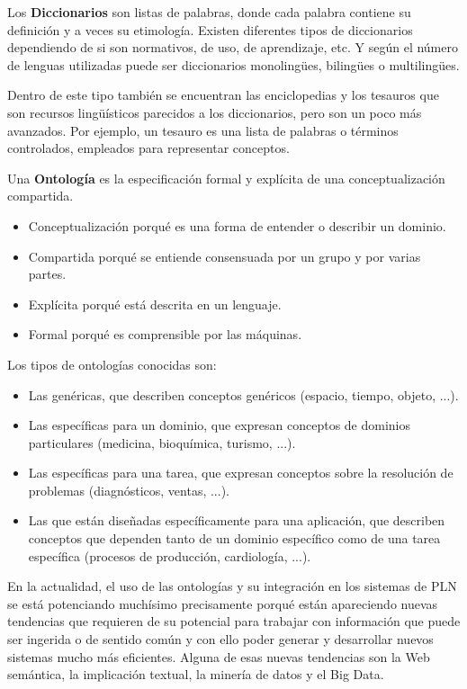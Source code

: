 \documentclass[11pt]{exam}
\begin{document}
\begin{questions}
Los {\bf Diccionarios} son listas de palabras, donde cada palabra contiene su definición y a veces su etimología. Existen diferentes tipos de diccionarios dependiendo de si son normativos, de uso, de aprendizaje, etc. Y según el número de lenguas utilizadas puede ser diccionarios monolingües, bilingües o multilingües.

Dentro de este tipo también se encuentran las enciclopedias y los tesauros que son recursos lingüísticos parecidos a los diccionarios, pero son un poco más avanzados. Por ejemplo, un tesauro es una lista de palabras o términos controlados, empleados para representar conceptos.

Una {\bf Ontología} es la especificación formal y explícita de una conceptualización compartida.

\begin{itemize}
	\item Conceptualización porqué es una forma de entender o describir un dominio. 
	\item Compartida porqué se entiende consensuada por un grupo y por varias partes.
	\item Explícita porqué está descrita en un lenguaje.
	\item Formal porqué es comprensible por las máquinas.
\end{itemize}

Los tipos de ontologías conocidas son:

\begin{itemize}
	\item Las genéricas, que describen conceptos genéricos (espacio, tiempo, objeto, ...).
	\item Las específicas para un dominio, que expresan conceptos de dominios particulares (medicina, bioquímica, turismo, ...).
	\item Las específicas para una tarea, que expresan conceptos sobre la resolución de problemas (diagnósticos, ventas, ...).
	\item Las que están diseñadas específicamente para una aplicación, que describen conceptos que dependen tanto de un dominio específico como de una tarea específica
	(procesos de producción, cardiología, ...).
\end{itemize}

En la actualidad, el uso de las ontologías y su integración en los sistemas de PLN se está potenciando muchísimo precisamente porqué están apareciendo nuevas tendencias que requieren de su potencial para trabajar con información que puede ser ingerida o de sentido común y con ello poder generar y desarrollar nuevos sistemas mucho más eficientes. Alguna de esas nuevas tendencias son la Web semántica, la implicación textual, la minería de datos y el Big Data. 


\end{questions}
\end{document}
